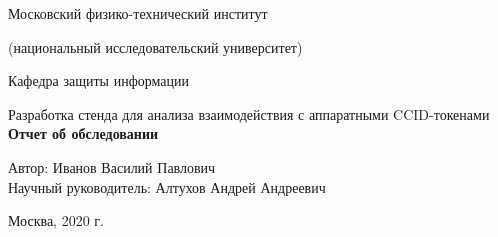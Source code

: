 \begin{titlepage}
  \begin{center}
    Московский физико-технический институт

    (национальный исследовательский университет)
    \vspace{0.25cm}

    Кафедра защиты информации

    \vfill
    {\LARGE Разработка стенда для анализа взаимодействия с аппаратными CCID-токенами }
    \vfill
    \vspace{0.25cm}
    \textbf{Отчет об обследовании}\\[5mm]
  \bigskip
     
\end{center}
\vfill
 
\begin{flushright}
  Автор: Иванов Василий Павлович \\
  Научный руководитель: Алтухов Андрей Андреевич
\end{flushright}
\vfill 
\begin{center}
  Москва, 2020 г.
\end{center}
\end{titlepage}